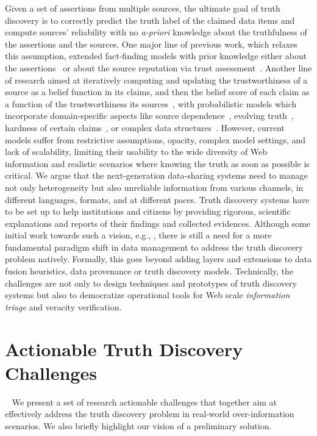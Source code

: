 \documentclass[prodmode,acmtecs]{acmsmall} %
\begin{document}
Given a set of assertions from multiple sources, the ultimate goal of truth discovery is to correctly predict the truth label of the claimed
data items and compute sources' reliability with no \emph{a-priori} knowledge about the truthfulness of the assertions and the sources. One 
major line of previous work, which relaxes this assumption, extended fact-finding models with prior knowledge either about the assertions~\cite{PasternackR13} 
or about the source reputation via trust assessment~\cite{BalakrishnanK11}. Another line of research aimed at iteratively computing and updating the trustworthiness
of a source as a belief function in its claims, and then the belief score of each claim as a function of the trustworthiness its sources~\cite{YinHY08}, with 
probabilistic models which incorporate domain-specific aspects like source dependence~\cite{DongBHS10a}, evolving truth~\cite{DongBS09a}, hardness of certain 
claims~\cite{GallandAMS10}, or complex data structures~\cite{ZhaoRGH12,GoasdoueKKLMZ13}. However, current models suffer from restrictive assumptions, opacity, complex model
settings, and lack of scalability, limiting their usability to the wide diversity of Web information and realistic scenarios where knowing the truth as soon as possible 
is critical. 
 We argue that the next-generation data-sharing systems need to manage not only heterogeneity but also unreliable 
 information from various channels, in different languages, formats, and at different paces. Truth discovery systems 
 have to be set up to help institutions and citizens by providing rigorous, scientific explanations and reports 
 of their findings and collected evidences. Although some initial work towards such a vision,
 e.g., \cite{DongS2013,DongBHS10a,LiDLMS12}, there is still a need for a more fundamental paradigm shift in data
 management to address the truth discovery problem natively. Formally, this goes beyond adding layers and extensions to
 data fusion heuristics, data provenance or truth discovery models. Technically, the challenges are not only to  design 
 techniques and prototypes of truth discovery systems but also to democratize operational tools for Web scale \emph{information
 triage} and veracity verification.
  
  
  

 
\section{Actionable Truth Discovery Challenges}~\label{sect:challenges-solutions}
We present a set of research actionable challenges that together aim at effectively address 
the truth discovery problem in real-world over-information scenarios. We also briefly highlight
our vision of a preliminary solution.
\end{document}
